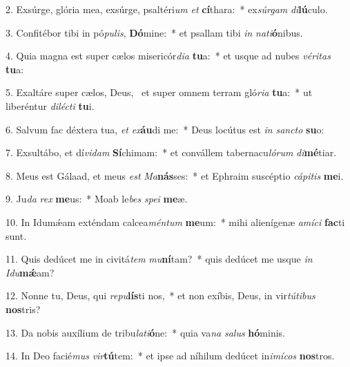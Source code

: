 2. Exsúrge, glória mea, exsúrge, psaltéri\textit{um} \textit{et} \textbf{cí}thara:~*  ex\textit{súr}\textit{gam} \textit{di}\textbf{lú}culo.\

3. Confitébor tibi in pó\textit{pu}\textit{lis}, \textbf{Dó}mine:~*  et psallam tibi \textit{in} \textit{na}\textit{ti}\textbf{ó}nibus.\

4. Quia magna est super cælos misericór\textit{di}\textit{a} \textbf{tu}a:~*  et usque ad nubes \textit{vé}\textit{ri}\textit{tas} \textbf{tu}a:\

5. Exaltáre super cælos, Deus, \dag\  et super omnem terram gló\textit{ri}\textit{a} \textbf{tu}a:~*  ut liberéntur \textit{di}\textit{léc}\textit{ti} \textbf{tu}i.\

6. Salvum fac déxtera tua, \textit{et} \textit{ex}\textbf{áu}di me:~*  Deus locútus est \textit{in} \textit{sanc}\textit{to} \textbf{su}o:\

7. Exsultábo, et dí\textit{vi}\textit{dam} \textbf{Sí}chimam:~*  et convállem tabernacu\textit{ló}\textit{rum} \textit{di}\textbf{mé}tiar.\

8. Meus est Gálaad, et meus \textit{est} \textit{Ma}\textbf{nás}ses:~*  et Ephraim suscéptio \textit{cá}\textit{pi}\textit{tis} \textbf{me}i.\

9. Ju\textit{da} \textit{rex} \textbf{me}us:~*  Moab le\textit{bes} \textit{spe}\textit{i} \textbf{me}æ.\

10. In Idumǽam exténdam calcea\textit{mén}\textit{tum} \textbf{me}um:~*  mihi alienígenæ \textit{a}\textit{mí}\textit{ci} \textbf{fac}ti sunt.\

11. Quis dedúcet me in civitá\textit{tem} \textit{mu}\textbf{ní}tam?~*  quis dedúcet me usque \textit{in} \textit{I}\textit{du}\textbf{mǽ}am?\

12. Nonne tu, Deus, qui \textit{re}\textit{pu}\textbf{lís}ti nos,~*  et non exíbis, Deus, in vir\textit{tú}\textit{ti}\textit{bus} \textbf{nos}tris?\

13. Da nobis auxílium de tribu\textit{la}\textit{ti}\textbf{ó}ne:~*  quia va\textit{na} \textit{sa}\textit{lus} \textbf{hó}minis.\

14. In Deo facié\textit{mus} \textit{vir}\textbf{tú}tem:~*  et ipse ad níhilum dedúcet in\textit{i}\textit{mí}\textit{cos} \textbf{nos}tros.\

